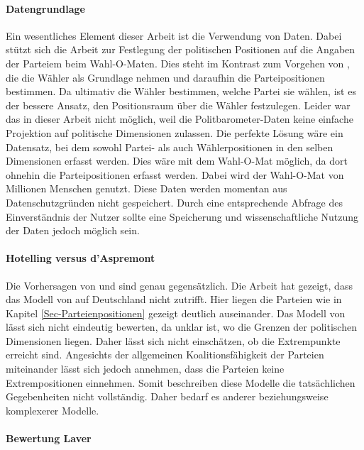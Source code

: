 \paragraph{Datengrundlage}
Ein wesentliches Element dieser Arbeit ist die Verwendung von Daten. Dabei stützt sich die Arbeit zur Festlegung der politischen Positionen auf die Angaben der Parteiem beim Wahl-O-Maten. Dies steht im Kontrast zum Vorgehen von \citet{schofield1998germany}, die die Wähler als Grundlage nehmen und daraufhin die Parteipositionen bestimmen. Da ultimativ die Wähler bestimmen, welche Partei sie wählen, ist es der bessere Ansatz, den Positionsraum über die Wähler festzulegen. Leider war das in dieser Arbeit nicht möglich, weil die Politbarometer-Daten keine einfache Projektion auf politische Dimensionen zulassen. Die perfekte Lösung wäre ein Datensatz, bei dem sowohl Partei- als auch Wählerpositionen in den selben Dimensionen erfasst werden. Dies wäre mit dem Wahl-O-Mat möglich, da dort ohnehin die Parteipositionen erfasst werden. Dabei wird der Wahl-O-Mat von Millionen Menschen genutzt. Diese Daten werden momentan aus Datenschutzgründen nicht gespeichert. Durch eine entsprechende Abfrage des Einverständnis der Nutzer sollte eine Speicherung und wissenschaftliche Nutzung der Daten jedoch möglich sein.

\paragraph{Hotelling versus d'Aspremont}
Die Vorhersagen von \citet{hotelling1929} und \citet{aspremont1979} sind genau gegensätzlich. Die Arbeit hat gezeigt, dass das Modell von \citet{hotelling1929} auf Deutschland nicht zutrifft. Hier liegen die Parteien wie in Kapitel \ref{Sec-Parteienpositionen} gezeigt deutlich auseinander. Das Modell von \citet{aspremont1979} lässt sich nicht eindeutig bewerten, da unklar ist, wo die Grenzen der politischen Dimensionen liegen. Daher lässt sich nicht einschätzen, ob die Extrempunkte erreicht sind. Angesichts der allgemeinen Koalitionsfähigkeit der Parteien miteinander lässt sich jedoch annehmen, dass die Parteien keine Extrempositionen einnehmen. Somit beschreiben diese Modelle die tatsächlichen Gegebenheiten nicht vollständig. Daher bedarf es anderer beziehungsweise komplexerer Modelle.

\paragraph{Bewertung Laver}

